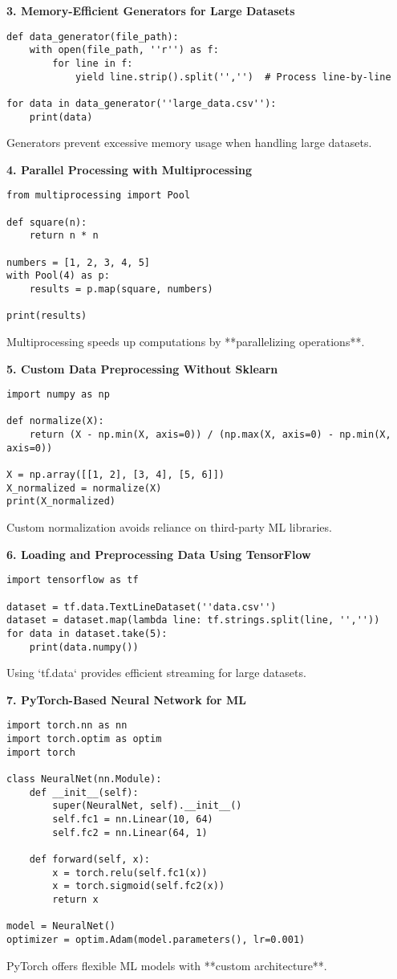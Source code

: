 \textbf{3. Memory-Efficient Generators for Large Datasets}
\begin{verbatim}
def data_generator(file_path):
    with open(file_path, ''r'') as f:
        for line in f:
            yield line.strip().split('','')  # Process line-by-line

for data in data_generator(''large_data.csv''):
    print(data)
\end{verbatim}
Generators prevent excessive memory usage when handling large datasets.

\textbf{4. Parallel Processing with Multiprocessing}
\begin{verbatim}
from multiprocessing import Pool

def square(n):
    return n * n

numbers = [1, 2, 3, 4, 5]
with Pool(4) as p:
    results = p.map(square, numbers)

print(results)
\end{verbatim}
Multiprocessing speeds up computations by **parallelizing operations**.

\textbf{5. Custom Data Preprocessing Without Sklearn}
\begin{verbatim}
import numpy as np

def normalize(X):
    return (X - np.min(X, axis=0)) / (np.max(X, axis=0) - np.min(X, axis=0))

X = np.array([[1, 2], [3, 4], [5, 6]])
X_normalized = normalize(X)
print(X_normalized)
\end{verbatim}
Custom normalization avoids reliance on third-party ML libraries.

\textbf{6. Loading and Preprocessing Data Using TensorFlow}
\begin{verbatim}
import tensorflow as tf

dataset = tf.data.TextLineDataset(''data.csv'')
dataset = dataset.map(lambda line: tf.strings.split(line, '',''))
for data in dataset.take(5):
    print(data.numpy())
\end{verbatim}
Using `tf.data` provides efficient streaming for large datasets.

\textbf{7. PyTorch-Based Neural Network for ML}
\begin{verbatim}
import torch.nn as nn
import torch.optim as optim
import torch

class NeuralNet(nn.Module):
    def __init__(self):
        super(NeuralNet, self).__init__()
        self.fc1 = nn.Linear(10, 64)
        self.fc2 = nn.Linear(64, 1)

    def forward(self, x):
        x = torch.relu(self.fc1(x))
        x = torch.sigmoid(self.fc2(x))
        return x

model = NeuralNet()
optimizer = optim.Adam(model.parameters(), lr=0.001)
\end{verbatim}
PyTorch offers flexible ML models with **custom architecture**.

